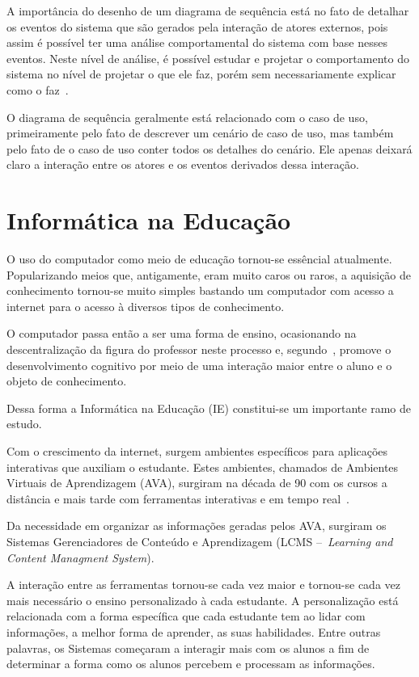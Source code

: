 A importância do desenho de um diagrama de sequência está no fato de detalhar os eventos do sistema que são gerados pela interação de atores externos, pois assim é possível ter uma análise comportamental do sistema com base nesses eventos. Neste nível de análise, é possível estudar e projetar o comportamento do sistema no nível de projetar o que ele faz, porém sem necessariamente explicar como o faz~\cite{larman08}.

O diagrama de sequência geralmente está relacionado com o caso de uso, primeiramente pelo fato de descrever um cenário de caso de uso, mas também pelo fato de o caso de uso conter todos os detalhes do cenário. Ele apenas deixará claro a interação entre os atores e os eventos derivados dessa interação.

\section{Informática na Educação}
O uso do computador como meio de educação tornou-se essêncial atualmente. Popularizando meios que, antigamente, eram muito caros ou raros, a aquisição de conhecimento tornou-se muito simples bastando um computador com acesso a internet para o acesso à diversos tipos de conhecimento.

O computador passa então a ser uma forma de ensino, ocasionando na descentralização da figura do professor neste processo e, segundo~\cite{de2009}, promove o desenvolvimento cognitivo por meio de uma interação maior entre o aluno e o objeto de conhecimento.

Dessa forma a Informática na Educação (IE) constitui-se um importante ramo de estudo.

Com o crescimento da internet, surgem ambientes específicos para aplicações interativas que auxiliam o estudante. Estes ambientes, chamados de Ambientes Virtuais de Aprendizagem (AVA), surgiram na década de 90 com os cursos a distância e mais tarde com ferramentas interativas e em tempo real~\cite{penterich2005ambientes}.

Da necessidade em organizar as informações geradas pelos AVA, surgiram os Sistemas Gerenciadores de Conteúdo e Aprendizagem (LCMS –~\emph{Learning and Content Managment System}).

A interação entre as ferramentas tornou-se cada vez maior e tornou-se  cada vez mais necessário o ensino personalizado à cada estudante. A personalização está relacionada com a forma específica que cada estudante tem ao lidar com informações, a melhor forma de aprender, as suas habilidades. Entre outras palavras, os Sistemas começaram a interagir mais com os alunos a fim de determinar a forma como os alunos percebem e processam as informações.

